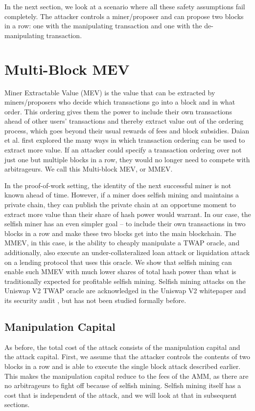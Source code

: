 In the next section, we look at a scenario where all these safety assumptions fail completely. The attacker controls a miner/proposer and can propose two blocks in a row: one with the manipulating transaction and one with the de-manipulating transaction. 

\section{Multi-Block MEV}
Miner Extractable Value (MEV) is the value that can be extracted by miners/proposers who decide which transactions go into a block and in what order. This ordering gives them the power to include their own transactions ahead of other users' transactions and thereby extract value out of the ordering process, which goes beyond their usual rewards of fees and block subsidies. Daian et al. \cite{daian2019flashboys} first explored the many ways in which transaction ordering can be used to extract more value. If an attacker could specify a transaction ordering over not just one but multiple blocks in a row, they would no longer need to compete with arbitrageurs. We call this Multi-block MEV, or MMEV. 

In the proof-of-work setting, the identity of the next successful miner is not known ahead of time. However, if a miner does selfish mining \cite{eyal2014majority,sapirshtein2016optimal,Ritz_2018} and maintains a private chain, they can publish the private chain at an opportune moment to extract more value than their share of hash power would warrant. In our case, the selfish miner has an even simpler goal -- to include their own transactions in two blocks in a row and make these two blocks get into the main blockchain. The MMEV, in this case, is the ability to cheaply manipulate a TWAP oracle, and additionally, also execute an under-collateralized loan attack or liquidation attack on a lending protocol that uses this oracle. We show that selfish mining can enable such MMEV with much lower shares of total hash power than what is traditionally expected for profitable selfish mining. Selfish mining attacks on the Uniswap V2 TWAP oracle are acknowledged in the Uniswap V2 whitepaper \cite{Adams2020UniV2} and its security audit \cite{UniswapAudit}, but has not been studied formally before.

\subsection{Manipulation Capital}
As before, the total cost of the attack consists of the manipulation capital and the attack capital. First, we assume that the attacker controls the contents of two blocks in a row and is able to execute the single block attack described earlier. This makes the manipulation capital reduce to the fees of the AMM, as there are no arbitrageurs to fight off because of selfish mining. Selfish mining itself has a cost that is independent of the attack, and we will look at that in subsequent sections.

